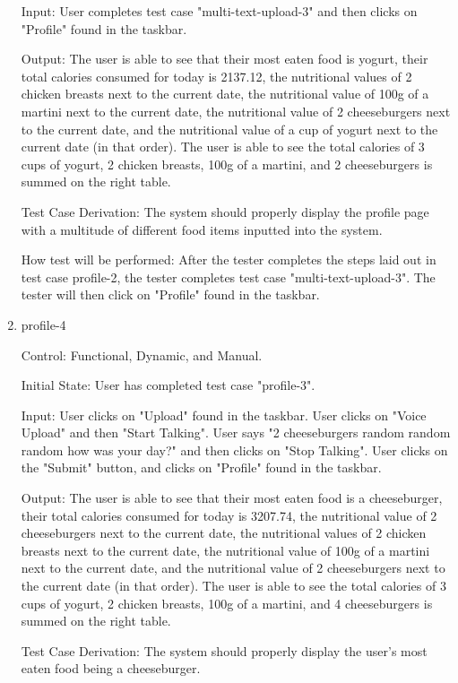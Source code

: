 \documentclass[12pt, titlepage]{article}
\begin{document}
\begin{enumerate}
		Input: User completes test case "multi-text-upload-3" and then clicks on "Profile" found in the taskbar.
		
		Output: The user is able to see that their most eaten food is yogurt, their total calories consumed for today is 2137.12, the nutritional values of 2 chicken breasts next to the current date, the nutritional value of 100g of a martini next to the current date, the nutritional value of 2 cheeseburgers next to the current date, and the nutritional value of a cup of yogurt next to the current date (in that order). The user is able to see the total calories of 3 cups of yogurt, 2 chicken breasts, 100g of a martini, and 2 cheeseburgers is summed on the right table.
		
		Test Case Derivation: The system should properly display the profile page with a multitude of different food items inputted into the system.
		
		How test will be performed: After the tester completes the steps laid out in test case profile-2, the tester completes test case "multi-text-upload-3". The tester will then click on "Profile" found in the taskbar.
		
		\item{profile-4\\}
		
		Control: Functional, Dynamic, and Manual.
		
		Initial State: User has completed test case "profile-3".
		
		Input: User clicks on "Upload" found in the taskbar. User clicks on "Voice Upload" and then "Start Talking". User says "2 cheeseburgers random random random how was your day?" and then clicks on "Stop Talking". User clicks on the "Submit" button, and clicks on "Profile" found in the taskbar.
		
		Output: The user is able to see that their most eaten food is a cheeseburger, their total calories consumed for today is 3207.74, the nutritional value of 2 cheeseburgers next to the current date, the nutritional values of 2 chicken breasts next to the current date, the nutritional value of 100g of a martini next to the current date, and the nutritional value of 2 cheeseburgers next to the current date (in that order). The user is able to see the total calories of 3 cups of yogurt, 2 chicken breasts, 100g of a martini, and 4 cheeseburgers is summed on the right table.
		
		Test Case Derivation: The system should properly display the user's most eaten food being a cheeseburger.
		

\end{enumerate}
\end{document}

